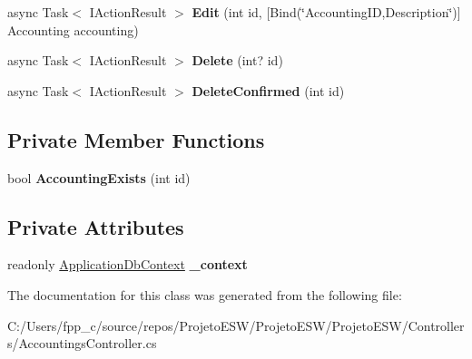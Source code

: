 \begin{DoxyCompactItemize}
async Task$<$ I\+Action\+Result $>$ {\bfseries Edit} (int id, \mbox{[}Bind(\char`\"{}Accounting\+ID,Description\char`\"{})\mbox{]} Accounting accounting)
\item 
\mbox{\label{class_projeto_e_s_w_1_1_controllers_1_1_accountings_controller_a954e91522c96b1f33a878c8a1fee1765}} 
async Task$<$ I\+Action\+Result $>$ {\bfseries Delete} (int? id)
\item 
\mbox{\label{class_projeto_e_s_w_1_1_controllers_1_1_accountings_controller_a2800c8d70c7db12e4d004c524c825178}} 
async Task$<$ I\+Action\+Result $>$ {\bfseries Delete\+Confirmed} (int id)
\end{DoxyCompactItemize}
\subsection*{Private Member Functions}
\begin{DoxyCompactItemize}
\item 
\mbox{\label{class_projeto_e_s_w_1_1_controllers_1_1_accountings_controller_ad4484afeb0013bb1b5710d80a605e57f}} 
bool {\bfseries Accounting\+Exists} (int id)
\end{DoxyCompactItemize}
\subsection*{Private Attributes}
\begin{DoxyCompactItemize}
\item 
\mbox{\label{class_projeto_e_s_w_1_1_controllers_1_1_accountings_controller_adda762952264feb8c14ebf40bc64158f}} 
readonly \mbox{\hyperlink{class_projeto_e_s_w_1_1_data_1_1_application_db_context}{Application\+Db\+Context}} {\bfseries \+\_\+context}
\end{DoxyCompactItemize}


The documentation for this class was generated from the following file\+:\begin{DoxyCompactItemize}
\item 
C\+:/\+Users/fpp\+\_\+c/source/repos/\+Projeto\+E\+S\+W/\+Projeto\+E\+S\+W/\+Projeto\+E\+S\+W/\+Controllers/Accountings\+Controller.\+cs\end{DoxyCompactItemize}
